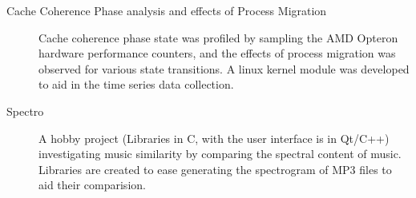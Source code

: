 \begin{description}
\item[Cache Coherence Phase analysis and effects of Process Migration]
Cache coherence phase state was profiled by sampling the AMD Opteron hardware performance counters, and the effects of process migration was observed for various state transitions. A linux kernel module was developed to aid in the time series data collection.

\item[Spectro]
A hobby project (Libraries in C, with the user interface is in Qt/C++) investigating music similarity by comparing the spectral content of music. Libraries are created to ease generating the spectrogram of MP3 files to aid their comparision.

\end{description}

